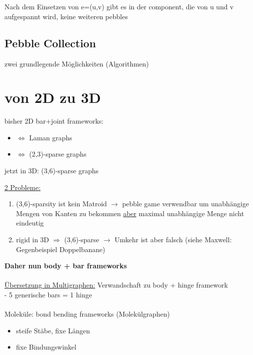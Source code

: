 \documentclass[12pt,a4paper]{article}
\begin{document}
\\\\
Nach dem Einsetzen von e=(u,v) gibt es in der component, die von u und v aufgespannt wird, keine weiteren pebbles
\subsection{Pebble Collection}
zwei grundlegende Möglichkeiten (Algorithmen)

\section{von 2D zu 3D}
bisher 2D bar+joint frameworks:
\begin{itemize}
	\item $\Leftrightarrow$ Laman graphs
	\item $\Leftrightarrow$ (2,3)-sparse graphs
\end{itemize}

jetzt in 3D: (3,6)-sparse graphs\\
\parbox{\linewidth}{
\underline{2 Probleme:}
\begin{enumerate}
	\item (3,6)-sparsity ist kein Matroid $\rightarrow$ pebble game verwendbar um unabhängige Mengen von Kanten zu bekommen \underline{aber} maximal unabhängige Menge nicht eindeutig
	\item rigid in 3D $\Rightarrow$ (3,6)-sparse $\rightarrow$ Umkehr ist aber falsch (siehe Maxwell: Gegenbeispiel Doppelbanane)
\end{enumerate}
}
\textbf{Daher nun body + bar frameworks}
\\\\
\underline{Übersetzung in Multigraphen:} Verwandschaft zu body +  hinge framework\\
 - 5 generische bars = 1 hinge\\
\\
Moleküle: bond bending frameworks (Molekülgraphen)
\begin{itemize}
	\item steife Stäbe, fixe Längen
	\item fixe Bindungswinkel
\end{itemize}
\end{document}
